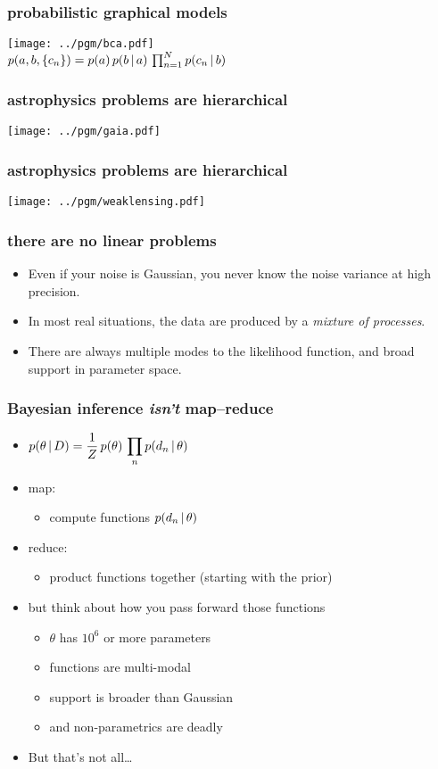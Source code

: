 \documentclass[pdftex]{beamer}
\begin{document}
\begin{frame}
  \frametitle{probabilistic graphical models}
  \texttt{[image: ../pgm/bca.pdf]}\\
  $p(a, b, \{c_n\}) = p(a)\,p(b\,|\, a)\,\prod_{n=1}^N p(c_n\,|\, b)$
\end{frame}

\begin{frame}
  \frametitle{astrophysics problems are hierarchical}
  \texttt{[image: ../pgm/gaia.pdf]}
\end{frame}

\begin{frame}
  \frametitle{astrophysics problems are hierarchical}
  \texttt{[image: ../pgm/weaklensing.pdf]}
\end{frame}

\begin{frame}
  \frametitle{there are no linear problems}
  \begin{itemize}
  \item Even if your noise is Gaussian, you never know the noise
    variance at high precision.
  \item In most real situations, the data are produced by a
    \emph{mixture of processes}.
  \item There are always multiple modes to the likelihood function,
    and broad support in parameter space.
  \end{itemize}
\end{frame}

\begin{frame}
  \frametitle{Bayesian inference \emph{isn't} map--reduce}
  \begin{itemize}
  \item $\displaystyle p(\theta\,|\, D) = \frac{1}{Z}\,p(\theta)\,\prod_n p(d_n\,|\,\theta)$
  \item map:
    \begin{itemize}
    \item compute functions $p(d_n\,|\,\theta)$
    \end{itemize}
  \item reduce:
    \begin{itemize}
    \item product functions together (starting with the prior)
    \end{itemize}
  \item but think about how you pass forward those functions
    \begin{itemize}
    \item $\theta$ has $10^6$ or more parameters
    \item functions are multi-modal
    \item support is broader than Gaussian
    \item and non-parametrics are deadly
    \end{itemize}
  \item But that's not all\ldots
  \end{itemize}
\end{frame}
\end{document}
